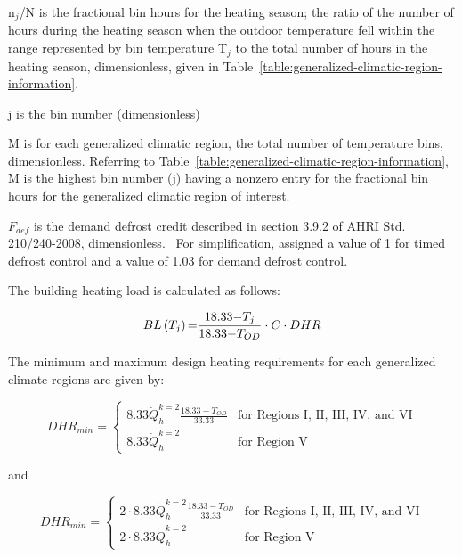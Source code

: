 n\(_{j}\)/N is the fractional bin hours for the heating season; the ratio of the number of hours during the heating season when the outdoor temperature fell within the range represented by bin temperature T\(_{j}\) to the total number of hours in the heating season, dimensionless, given in Table~\ref{table:generalized-climatic-region-information}.

j is the bin number (dimensionless)

M is for each generalized climatic region, the total number of temperature bins, dimensionless. Referring to Table~\ref{table:generalized-climatic-region-information}, M is the highest bin number (j) having a nonzero entry for the fractional bin hours for the generalized climatic region of interest.

\({F_{def}}\) is the demand defrost credit described in section 3.9.2 of AHRI Std. 210/240-2008, dimensionless.~ For simplification, assigned a value of 1 for timed defrost control and a value of 1.03 for demand defrost control.

The building heating load is calculated as follows:

\begin{equation}
BL\left( {{T_j}} \right){\rm{ = }}\frac{{{\rm{18}}{\rm{.33 - }}{T_j}}}{{{\rm{18}}{\rm{.33 - }}{T_{OD}}}} \cdot C \cdot DHR
\end{equation}

The minimum and maximum design heating requirements for each generalized climate regions are given by:

\begin{equation}
DHR_{min} = \left\{  \begin{array}{cl}
                         8.33 \dot{Q}_h^{k = 2} \frac{18.33-T_{OD}}{33.33} & \text{for Regions I, II, III, IV, and VI} \\
                         8.33 \dot{Q}_h^{k = 2} & \text{for Region V}
                     \end{array}
            \right.
\end{equation}

and

\begin{equation}
DHR_{min} = \left\{  \begin{array}{cl}
                         2 \cdot 8.33 \dot{Q}_h^{k = 2} \frac{18.33-T_{OD}}{33.33} & \text{for Regions I, II, III, IV, and VI} \\
                         2 \cdot 8.33 \dot{Q}_h^{k = 2} & \text{for Region V}
                     \end{array}
            \right.
\end{equation}

